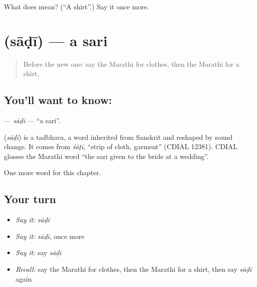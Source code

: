 \begin{tcolorbox}[breakable,colback=teal!4,colframe=teal!35!black,title={Before you move on}]
What does  mean? (\textquotedblleft{}A shirt\textquotedblright{}.) Say it once more.
\end{tcolorbox}
\section[\texorpdfstring{\mr{साडी} (sāḍī)}{साडी (sāḍī)}]{ (sāḍī) — a sari}

\label{lesson:MR-C116-sadi}



\begin{quote}
Before the new one: say the Marathi for clothes, then the Marathi for a shirt.
\end{quote}

\subsection*{You'll want to know: }
\textbf{} — \emph{sāḍī} — \textquotedblleft{}a sari\textquotedblright{}.

\begin{cousinweb}
\textbf{} (\emph{sāḍī}) is a tadbhava, a word inherited from Sanskrit and reshaped by sound change. It comes from \emph{śāṭī}, \textquotedblleft{}strip of cloth, garment\textquotedblright{} (CDIAL 12381). CDIAL glosses the Marathi word \textquotedblleft{}the sari given to the bride at a wedding\textquotedblright{}.
\end{cousinweb}

\begin{grammarlens}[title={What you've built}]
One more word for this chapter.
\end{grammarlens}

\subsection*{Your turn}
\begin{itemize}
\raggedright
  \item \emph{Say it:} \emph{sāḍī}
  \item \emph{Say it:} \emph{sāḍī}, once more
  \item \emph{Say it:} say \emph{sāḍī}
  \item \emph{Recall:} say the Marathi for clothes, then the Marathi for a shirt, then say \emph{sāḍī} again
\end{itemize}

